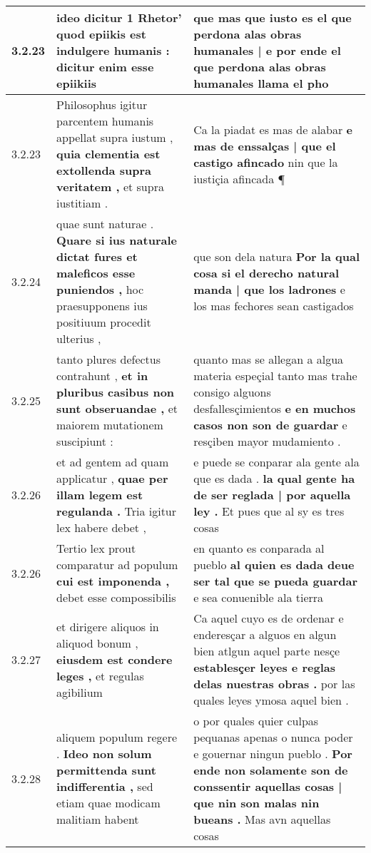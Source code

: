 \begin{tabular}{|p{1cm}|p{6.5cm}|p{6.5cm}|}
3.2.23 & ideo dicitur 1 Rhetor’ \textbf{ quod epiikis est indulgere humanis : } dicitur enim esse epiikiis & que mas que iusto es el \textbf{ que perdona alas obras humanales | e por ende el que perdona alas obras humanales } llama el pho \\\hline
3.2.23 & Philosophus igitur parcentem humanis appellat supra iustum , \textbf{ quia clementia est extollenda supra veritatem , } et supra iustitiam . & Ca la piadat es mas de alabar \textbf{ e mas de enssalças | que el castigo afincado } nin que la iustiçia afincada ¶ \\\hline
3.2.24 & quae sunt naturae . \textbf{ Quare si ius naturale dictat fures et maleficos esse puniendos , } hoc praesupponens ius positiuum procedit ulterius , & que son dela natura \textbf{ Por la qual cosa si el derecho natural manda | que los ladrones } e los mas fechores sean castigados \\\hline
3.2.25 & tanto plures defectus contrahunt , \textbf{ et in pluribus casibus non sunt obseruandae , } et maiorem mutationem suscipiunt : & quanto mas se allegan a algua materia espeçial tanto mas trahe consigo alguons desfallesçimientos \textbf{ e en muchos casos non son de guardar } e resçiben mayor mudamiento . \\\hline
3.2.26 & et ad gentem ad quam applicatur , \textbf{ quae per illam legem est regulanda . } Tria igitur lex habere debet , & e puede se conparar ala gente ala que es dada . \textbf{ la qual gente ha de ser reglada | por aquella ley . } Et pues que al sy es tres cosas \\\hline
3.2.26 & Tertio lex prout comparatur ad populum \textbf{ cui est imponenda , } debet esse compossibilis & en quanto es conparada al pueblo \textbf{ al quien es dada deue ser tal que se pueda guardar } e sea conuenible ala tierra \\\hline
3.2.27 & et dirigere aliquos in aliquod bonum , \textbf{ eiusdem est condere leges , } et regulas agibilium & Ca aquel cuyo es de ordenar e enderesçar a alguos en algun bien atlgun aquel parte nesçe \textbf{ establesçer leyes e reglas delas nuestras obras . } por las quales leyes ymosa aquel bien . \\\hline
3.2.28 & aliquem populum regere . \textbf{ Ideo non solum permittenda sunt indifferentia , } sed etiam quae modicam malitiam habent & o por quales quier culpas pequanas apenas o nunca poder e gouernar ningun pueblo . \textbf{ Por ende non solamente son de conssentir aquellas cosas | que nin son malas nin bueans . } Mas avn aquellas cosas \\\hline

\end{tabular}
